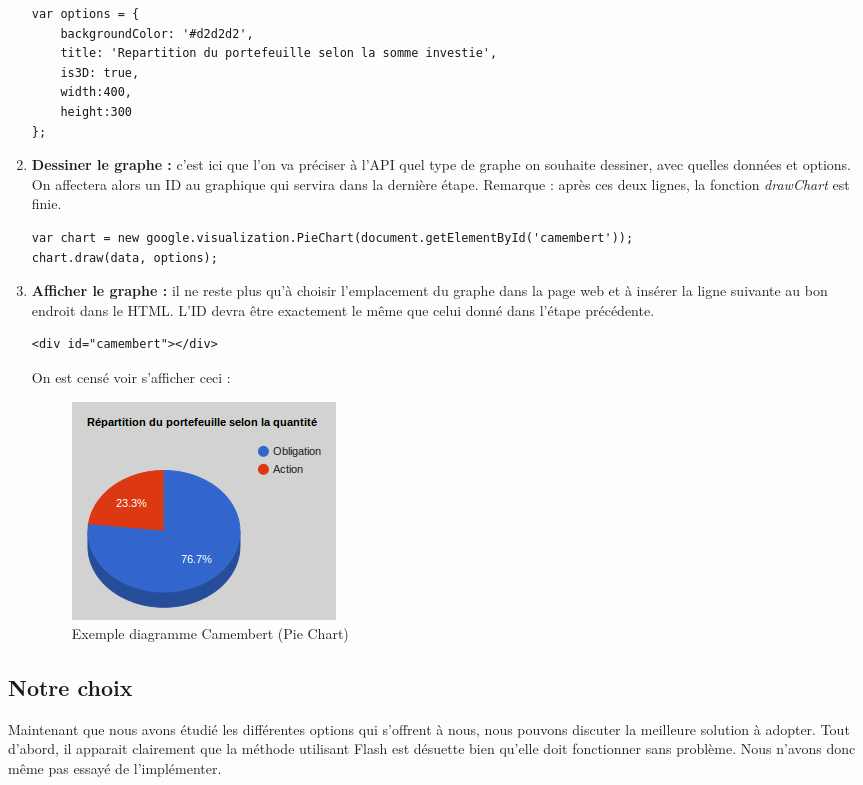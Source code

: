\begin{enumerate}
\begin{lstlisting} 
var options = {
    backgroundColor: '#d2d2d2',
    title: 'Repartition du portefeuille selon la somme investie',
    is3D: true,
    width:400,
    height:300
};
\end{lstlisting}
 \item \textbf{Dessiner le graphe :} c'est ici que l'on va préciser à l'API quel type de graphe on souhaite dessiner, avec quelles données et options. On affectera alors un ID au graphique qui servira dans la dernière étape. Remarque : après ces deux lignes, la fonction \textit{drawChart} est finie.
\begin{lstlisting}
var chart = new google.visualization.PieChart(document.getElementById('camembert'));
chart.draw(data, options);
\end{lstlisting} 
 \item \textbf{Afficher le graphe :} il ne reste plus qu'à choisir l'emplacement du graphe dans la page web et à insérer la ligne suivante au bon endroit dans le HTML. L'ID devra être exactement le même que celui donné dans l'étape précédente.
\begin{lstlisting}
<div id="camembert"></div>
\end{lstlisting}  
 
 On est censé voir s'afficher ceci :
\begin{figure}[H]
  \center
  \includegraphics[scale=0.6]{../graph/camembertAPI.png}
  \caption{Exemple diagramme Camembert (Pie Chart)}
\end{figure}
\end{enumerate}


\subsection{Notre choix}
Maintenant que nous avons étudié les différentes options qui s'offrent à nous, nous pouvons discuter la meilleure solution à adopter. Tout d'abord, il apparait clairement que la méthode utilisant Flash est désuette bien qu'elle doit fonctionner sans problème. Nous n'avons donc même pas essayé de l'implémenter.\\

